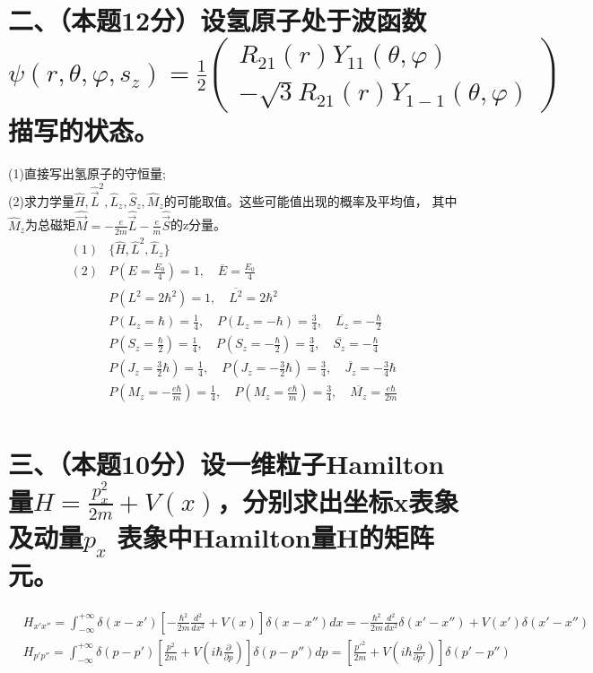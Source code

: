 \documentclass[UTF8]{ctexart}
\begin{document}
\section*{二、（本题12分）设氢原子处于波函数$\psi(r,\theta,\varphi,s_z)=\frac{1}{2}
    \begin{pmatrix}
      R_{21}(r)Y_{11}(\theta,\varphi) \\
      -\sqrt3R_{21}(r)Y_{1-1}(\theta,\varphi)
    \end{pmatrix}$描写的状态。}
 (1)直接写出氢原子的守恒量;\\
(2)求力学量$\hat H,\hat {\vec L}^2,\hat L_z,\hat S_z,\hat M_z$的可能取值。这些可能值出现的概率及平均值，
其中$\hat M_z$为总磁矩$\hat{\vec M}=-\frac{e}{2m}\hat{\vec L}-\frac{e}{m}\hat{\vec S}$的z分量。
\begin{equation*}
  \begin{aligned}
    (1) & \{\hat H,\hat L^2,\hat L_z\}                                                         \\
    (2) & P(E=\frac{E_0}{4})=1,\quad\overline{E}=\frac{E_0}{4}                                 \\
        & P(L^2=2\hbar^2)=1,\quad\overline{L^2}=2\hbar^2                                       \\
        & P(L_z=\hbar)=\frac{1}{4},\quad P(L_z=-\hbar)=\frac{3}{4},
    \quad\overline{L_z}=-\frac{\hbar}{2}                                                       \\
        & P(S_z=\frac{\hbar}{2})=\frac{1}{4},\quad P(S_z=-\frac{\hbar}{2})=\frac{3}{4},\quad
    \overline{S_z}=-\frac{\hbar}{4}                                                            \\
        & P(J_z=\frac{3}{2}\hbar)=\frac{1}{4},\quad P(J_z=-\frac{3}{2}\hbar)=\frac{3}{4},\quad
    \overline{J_z}=-\frac{3}{4}\hbar                                                           \\
        & P(M_z=-\frac{e\hbar}{m})=\frac{1}{4},\quad P(M_z=\frac{e\hbar}{m})=\frac{3}{4},\quad
    \overline{M_z}=\frac{e\hbar}{2m}                                                           \\
  \end{aligned}
\end{equation*}
\section*{三、（本题10分）设一维粒子Hamilton量$H=\frac{p_x^2}{2m}+V(x)$，分别求出坐标x表象及动量$p_x$
  表象中Hamilton量H的矩阵元。}
\begin{equation*}
  \begin{aligned}
     & H_{x'x''}=\int_{-\infty}^{+\infty}\delta(x-x')[-\frac{\hbar^2}{2m}\frac{d^2}{dx^2}+V(x)]
    \delta(x-x'')dx=-\frac{\hbar^2}{2m}\frac{d^2}{dx^2}\delta(x'-x'')+V(x')\delta(x'-x'')       \\
     & H_{p'p''}=\int_{-\infty}^{+\infty}\delta(p-p')[\frac{p^2}{2m}+V(i\hbar\frac{\partial}
      {\partial p})]\delta(p-p'')dp
    =[\frac{{p'}^2}{2m}+V(i\hbar\frac{\partial}{\partial p'})]\delta(p'-p'')
  \end{aligned}
\end{equation*}
\end{document}

